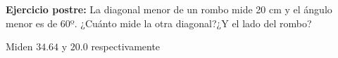 \documentclass[addpoints,spanish, 12pt,a4paper]{exam}
\begin{document}
\begin{questions}
	 \question[1] \textbf{Ejercicio postre:}  La diagonal menor de un rombo mide 20 cm y el ángulo menor es de 60º. ¿Cuánto mide la otra diagonal?¿Y el lado del rombo?\begin{solution} Miden $34.64$ y $20.0$ respectivamente\end{solution} 
	 
	 
	 
        





        
    \end{questions}
    
    
\end{document}
